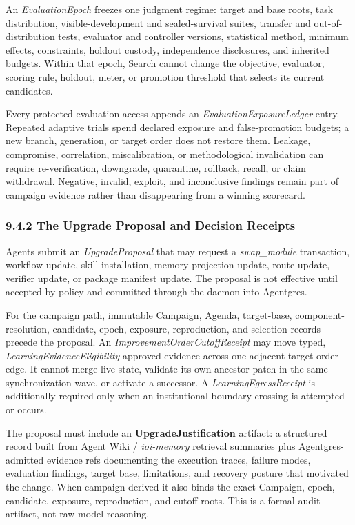 \documentclass[
  11pt,
]{article}
\begin{document}
An \emph{EvaluationEpoch} freezes one judgment regime: target and base roots,
task distribution, visible-development and sealed-survival suites, transfer and
out-of-distribution tests, evaluator and controller versions, statistical
method, minimum effects, constraints, holdout custody, independence disclosures,
and inherited budgets. Within that epoch, Search cannot change the objective,
evaluator, scoring rule, holdout, meter, or promotion threshold that selects its
current candidates.

Every protected evaluation access appends an
\emph{EvaluationExposureLedger} entry. Repeated adaptive trials spend declared
exposure and false-promotion budgets; a new branch, generation, or target order
does not restore them. Leakage, compromise, correlation, miscalibration, or
methodological invalidation can require re-verification, downgrade, quarantine,
rollback, recall, or claim withdrawal. Negative, invalid, exploit, and
inconclusive findings remain part of campaign evidence rather than disappearing
from a winning scorecard.

\hypertarget{the-upgrade-primitive-upgradereceipt}{%
\subsubsection{9.4.2 The Upgrade Proposal and Decision
Receipts}\label{the-upgrade-primitive-upgradereceipt}}

Agents submit an \emph{UpgradeProposal} that may request a
\emph{swap\_module} transaction, workflow update, skill installation,
memory projection update, route update, verifier update, or package
manifest update. The proposal is not effective until accepted by policy
and committed through the daemon into Agentgres.

For the campaign path, immutable Campaign, Agenda, target-base,
component-resolution, candidate, epoch, exposure, reproduction, and selection
records precede the proposal. An \emph{ImprovementOrderCutoffReceipt} may move
typed, \emph{LearningEvidenceEligibility}-approved evidence across one adjacent
target-order edge. It cannot merge live state, validate its own ancestor patch
in the same synchronization wave, or activate a successor. A
\emph{LearningEgressReceipt} is additionally required only when an
institutional-boundary crossing is attempted or occurs.

The proposal must include an \textbf{UpgradeJustification} artifact: a
structured record built from Agent Wiki / \emph{ioi-memory} retrieval
summaries plus Agentgres-admitted evidence refs documenting the execution
traces, failure modes, evaluation findings, target base, limitations, and
recovery posture that motivated the change. When campaign-derived it also binds
the exact Campaign, epoch, candidate, exposure, reproduction, and cutoff roots.
This is a formal audit artifact, not raw model reasoning.
\end{document}
